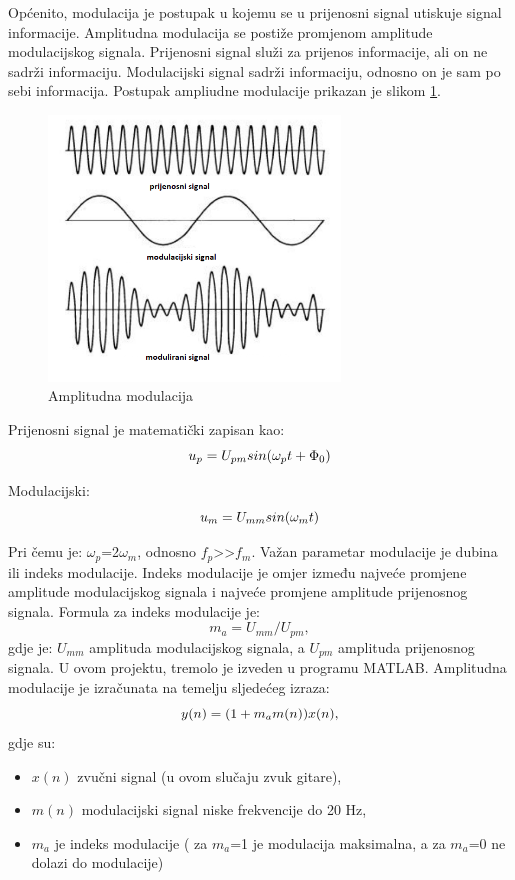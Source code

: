 \documentclass[conference]{IEEEtran}
\begin{document}
Općenito, modulacija je postupak u kojemu se u prijenosni signal utiskuje signal informacije. Amplitudna modulacija
se postiže promjenom amplitude modulacijskog signala. Prijenosni signal služi za prijenos informacije, ali on ne
sadrži informaciju. Modulacijski signal sadrži informaciju, odnosno on je sam po sebi informacija. Postupak ampliudne
 modulacije prikazan je slikom \ref{amp_mod}.

 \begin{figure}[H]
   \centerline{\includegraphics[height=200pt]{slike/amplitudna_modulacija.png}}
   \caption{Amplitudna modulacija}
   \label{amp_mod}
 \end{figure}

 Prijenosni signal je matematički zapisan kao:
\begin{equation}
  u_{p} = U_{pm}\*sin(\omega_{p}\*t+\Phi_{0})
  \label{mat_zapis}
\end{equation}

Modulacijski:
\begin{equation}
  u_{m} = U_{mm}\*sin(\omega_{m}\*t)
  \label{mod_zapis}
\end{equation}

Pri čemu je: $\omega_{p}$=2$\omega_{m}$, odnosno $f_{p}$>>$f_{m}$.
Važan parametar modulacije je dubina ili indeks modulacije. Indeks modulacije je omjer između najveće promjene
amplitude modulacijskog signala i najveće promjene amplitude prijenosnog signala. Formula za indeks modulacije je:
\begin{equation}
  m_{a} = U_{mm}/U_{pm},
  \label{indeks_mod}
\end{equation}
gdje je: $U_{mm}$  amplituda modulacijskog signala, a $U_{pm}$ amplituda prijenosnog signala.
U ovom projektu, tremolo je izveden u programu MATLAB. Amplitudna modulacije je izračunata na temelju sljedećeg izraza:
\begin{equation}
  y(n) = (1+ m_{a}\*m(n))\*x(n),
  \label{matlab_mod}
\end{equation}
gdje su:
\begin{itemize}
  \item{$x(n)$ zvučni signal (u ovom slučaju zvuk gitare),}
  \item{$m(n)$ modulacijski signal niske frekvencije do 20 Hz,}
  \item{$m_{a}$ je indeks modulacije ( za $m_{a}$=1 je modulacija maksimalna, a za $m_{a}$=0 ne dolazi do modulacije)}
\end{itemize}
\end{document}
